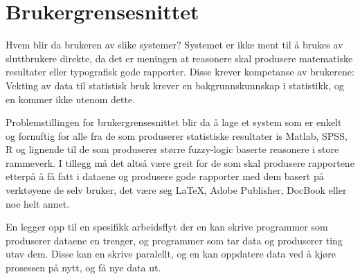 \documentclass[11pt]{article}
\begin{document}
\section{Brukergrensesnittet}
Hvem blir da brukeren av slike systemer?
Systemet er ikke ment til å brukes av sluttbrukere direkte, da det er meningen at reasonere skal produsere matematiske resultater eller typografisk gode rapporter. Disse krever kompetanse av brukerene: Vekting av data til statistisk bruk krever en bakgrunnskunnskap i statistikk, og en kommer ikke utenom dette.

Problemstillingen for brukergrensesnittet blir da å lage et system som er enkelt og fornuftig for alle fra de som produserer statistiske resultater is Matlab, SPSS, R og lignende til de som produserer større fuzzy-logic baserte reasonere i store rammeverk. I tillegg må det altså være greit for de som skal produsere rapportene etterpå å få fatt i dataene og produsere gode rapporter med dem basert på verktøyene de selv bruker, det være seg \LaTeX, Adobe Publisher, DocBook eller noe helt annet.

En legger opp til en spesifikk arbeidsflyt der en kan skrive programmer som produserer dataene en trenger, og programmer som tar data og produserer ting utav dem. Disse kan en skrive paralellt, og en kan oppdatere data ved å kjøre prosessen på nytt, og få nye data ut.
\end{document}
